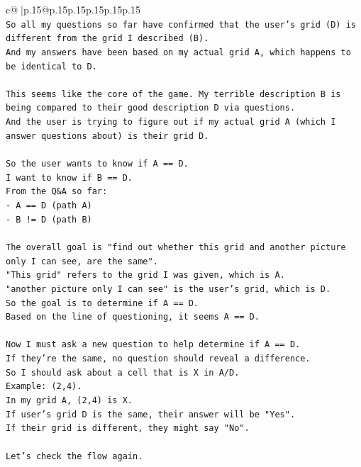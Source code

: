 \documentclass{article}
\begin{document}
{\begin{supertabular}{c@{$\;$}|p{.15\linewidth}@{}p{.15\linewidth}p{.15\linewidth}p{.15\linewidth}p{.15\linewidth}p{.15\linewidth}}
{{{\\ 
\texttt{So all my questions so far have confirmed that the user's grid (D) is different from the grid I described (B).} \\
\texttt{And my answers have been based on my actual grid A, which happens to be identical to D.} \\
\\ 
\texttt{This seems like the core of the game. My terrible description B is being compared to their good description D via questions.} \\
\texttt{And the user is trying to figure out if my actual grid A (which I answer questions about) is their grid D.} \\
\\ 
\texttt{So the user wants to know if A == D.} \\
\texttt{I want to know if B == D.} \\
\texttt{From the Q\&A so far:} \\
\texttt{{-} A == D (path A)} \\
\texttt{{-} B != D (path B)} \\
\\ 
\texttt{The overall goal is "find out whether this grid and another picture only I can see, are the same".} \\
\texttt{"This grid" refers to the grid I was given, which is A.} \\
\texttt{"another picture only I can see" is the user's grid, which is D.} \\
\texttt{So the goal is to determine if A == D.} \\
\texttt{Based on the line of questioning, it seems A == D.} \\
\\ 
\texttt{Now I must ask a new question to help determine if A == D.} \\
\texttt{If they're the same, no question should reveal a difference.} \\
\texttt{So I should ask about a cell that is X in A/D.} \\
\texttt{Example: (2,4).} \\
\texttt{In my grid A, (2,4) is X.} \\
\texttt{If user's grid D is the same, their answer will be "Yes".} \\
\texttt{If their grid is different, they might say "No".} \\
\\ 
\texttt{Let's check the flow again.} \\
}}}
\end{supertabular}}
\end{document}

